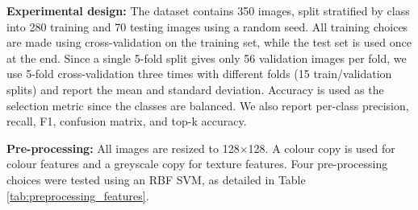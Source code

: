 \documentclass[12pt]{article}
\begin{document}
\textbf{Experimental design:} The dataset contains 350 images, split stratified by class into 280 training and 70 testing images using a random seed. All training choices are made using cross-validation on the training set, while the test set is used once at the end. Since a single 5-fold split gives only 56 validation images per fold, we use 5-fold cross-validation three times with different folds (15 train/validation splits) and report the mean and standard deviation. Accuracy is used as the selection metric since the classes are balanced. We also report per-class precision, recall, F1, confusion matrix, and top-k accuracy.

\textbf{Pre-processing:} All images are resized to 128$\times$128. A colour copy is used for colour features and a greyscale copy for texture features. Four pre-processing choices were tested using an RBF SVM, as detailed in Table \ref{tab:preprocessing_features}.
\end{document}
